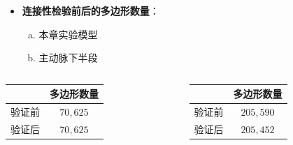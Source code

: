 \begin{frame}
\begin{itemize}
  \item \textbf{连接性检验前后的多边形数量}：
  \begin{enumerate}[(a)]
     \item 本章实验模型
     \item 主动脉下半段
  \end{enumerate}
\end{itemize}
\begin{table}
\renewcommand{\arraystretch}{0.5}
\centering
\begin{columns}[b,onlytextwidth]
\begin{column}{.5\textwidth}
\centering
\begin{tabular*}{35mm}{lc}
\toprule
~                                & \small{多边形数量} \\
\midrule
\small{验证前}                   & \small{$70,625$}  \\
\midrule
\small{验证后}                   & \small{$70,625$}  \\
\bottomrule
\end{tabular*}
\end{column}
\begin{column}{.5\textwidth}
\centering
\begin{tabular*}{35mm}{lc}
\toprule
~                                & \small{多边形数量} \\
\midrule
\small{验证前}                   & \small{$205,590$}  \\
\midrule
\small{验证后}                   & \small{$205,452$}  \\
\bottomrule
\end{tabular*}
\end{column}
\end{columns}
\end{table}
\end{frame}

